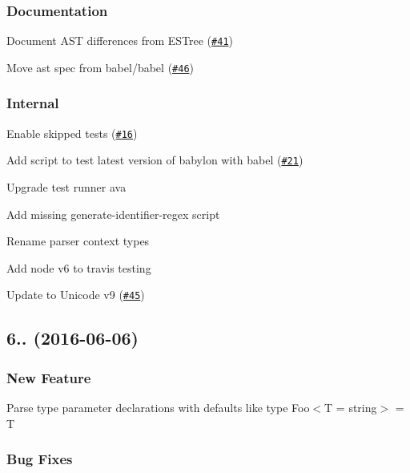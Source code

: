 \subsubsection*{Documentation}


\begin{DoxyItemize}
\item Document A\+ST differences from E\+S\+Tree (\href{https://github.com/babel/babylon/pull/41}{\tt \#41}) 
\item Move ast spec from babel/babel (\href{https://github.com/babel/babylon/pull/46}{\tt \#46}) 
\end{DoxyItemize}

\subsubsection*{Internal}


\begin{DoxyItemize}
\item Enable skipped tests (\href{https://github.com/babel/babylon/pull/16}{\tt \#16}) 
\item Add script to test latest version of babylon with babel (\href{https://github.com/babel/babylon/pull/21}{\tt \#21}) 
\item Upgrade test runner ava 
\item Add missing generate-\/identifier-\/regex script 
\item Rename parser context types 
\item Add node v6 to travis testing 
\item Update to Unicode v9 (\href{https://github.com/babel/babylon/pull/45}{\tt \#45}) 
\end{DoxyItemize}

\subsection*{6.. (2016-\/06-\/06)}

\subsubsection*{New Feature}


\begin{DoxyItemize}
\item Parse type parameter declarations with defaults like {\ttfamily type Foo$<$T = string$>$ = T}
\end{DoxyItemize}

\subsubsection*{Bug Fixes}


